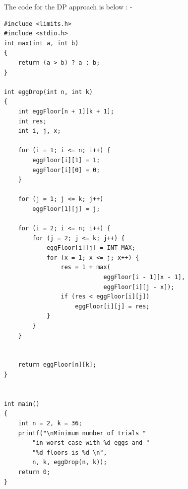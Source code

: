 \documentclass[12pt]{book}
\begin{document}
The code for the DP approach is below : - \\
\newline
\begin{lstlisting}
#include <limits.h> 
#include <stdio.h> 
int max(int a, int b) 
{ 
    return (a > b) ? a : b; 
} 

int eggDrop(int n, int k) 
{ 
    int eggFloor[n + 1][k + 1]; 
    int res; 
    int i, j, x; 

    for (i = 1; i <= n; i++) { 
        eggFloor[i][1] = 1; 
        eggFloor[i][0] = 0; 
    } 

    for (j = 1; j <= k; j++) 
        eggFloor[1][j] = j; 

    for (i = 2; i <= n; i++) { 
        for (j = 2; j <= k; j++) { 
            eggFloor[i][j] = INT_MAX; 
            for (x = 1; x <= j; x++) { 
                res = 1 + max( 
                            eggFloor[i - 1][x - 1], 
                            eggFloor[i][j - x]); 
                if (res < eggFloor[i][j]) 
                    eggFloor[i][j] = res; 
            } 
        } 
    } 


    return eggFloor[n][k]; 
} 


int main() 
{ 
    int n = 2, k = 36; 
    printf("\nMinimum number of trials "
        "in worst case with %d eggs and "
        "%d floors is %d \n", 
        n, k, eggDrop(n, k)); 
    return 0; 
} 

\end{lstlisting}
\end{document}
